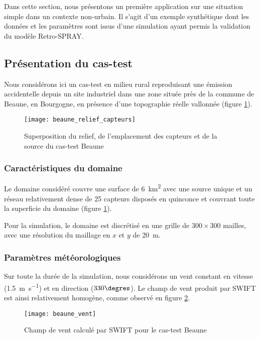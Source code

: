 Dans cette section, nous présentons un première application sur une situation  simple dans un contexte non-urbain. Il s'agit d'un exemple synthétique dont les données et les paramètres sont issus d'une simulation ayant permis la validation du modèle {Retro-SPRAY}.

\subsection{Présentation du cas-test}

Nous considérons ici un cas-test en milieu rural reproduisant une émission accidentelle depuis un site industriel dans une zone située près de la commune de Beaune, en Bourgogne, en présence d'une topographie réelle {vallonnée} (figure \ref{fig_beaune_relief}). 

\begin{figure}[h!]
	\centering
	\texttt{[image: beaune\_relief\_capteurs]}
	\caption{Superposition du relief, de l'emplacement des capteurs et de la source du cas-test Beaune}
	\label{fig_beaune_relief}
\end{figure}

\subsubsection{Caractéristiques du domaine}
Le domaine considéré couvre une surface de \SI{6}{\square\kilo\meter} avec une source unique et un réseau relativement dense de 25 capteurs disposés en quinconce et couvrant toute la superficie du domaine (figure \ref{fig_beaune_relief}).

Pour la simulation, le domaine est discrétisé en une grille de $300 \times 300$ mailles, avec une résolution du maillage en $x$ et $y$ de \SI{20}{\meter}.

\subsubsection{Paramètres météorologiques}
Sur toute la durée de la simulation, nous considérons un vent constant en vitesse (\SI{1.5}{\m\per\second}) et en direction ($330\degres$). Le champ de vent produit par SWIFT est ainsi relativement homogène, comme observé en figure \ref{fig_beaune_vent}.

\begin{figure}[h!]
	\centering
	\texttt{[image: beaune\_vent]}
	\caption{Champ de vent calculé par SWIFT pour le cas-test Beaune}
	\label{fig_beaune_vent}
\end{figure}


